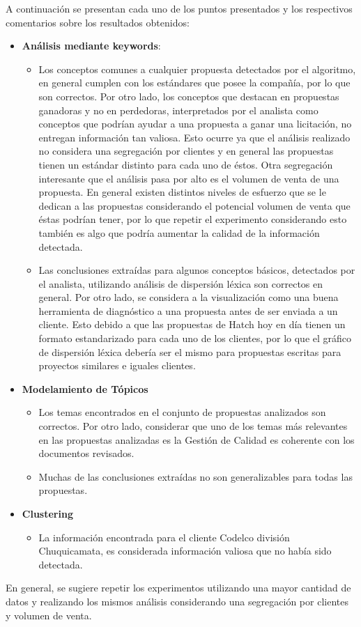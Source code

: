     A continuación se presentan cada uno de los puntos presentados y los respectivos comentarios sobre los resultados obtenidos:
    
    \begin{itemize}
        \item \textbf{Análisis mediante keywords}:
        \begin{itemize}
            \item Los conceptos comunes a cualquier propuesta detectados por el algoritmo, en general cumplen con los estándares que posee la compañía, por lo que son correctos. Por otro lado, los conceptos que destacan en propuestas ganadoras y no en perdedoras, interpretados por el analista como conceptos que podrían ayudar a una propuesta a ganar una licitación,  no entregan información tan valiosa. Esto ocurre ya que el análisis realizado no considera una segregación por clientes y en general las propuestas tienen un estándar distinto para cada uno de éstos. Otra segregación interesante que el análisis pasa por alto es el volumen de venta de una propuesta. En general existen distintos niveles de esfuerzo que se le dedican a las propuestas considerando el potencial volumen de venta que éstas podrían tener, por lo que repetir el experimento considerando esto también es algo que podría aumentar la calidad de la información detectada.
            
            \item Las conclusiones extraídas para algunos conceptos básicos, detectados por el analista, utilizando análisis de dispersión léxica son correctos en general. Por otro lado, se considera a la visualización como una buena herramienta de diagnóstico a una propuesta antes de ser enviada a un cliente. Esto debido a que las propuestas de Hatch hoy en día tienen un formato estandarizado para cada uno de los clientes, por lo que el gráfico de dispersión léxica debería ser el mismo para propuestas escritas para proyectos similares e iguales clientes. 
        \end{itemize}
        \item \textbf{Modelamiento de Tópicos }
        \begin{itemize}
            \item Los temas encontrados en el conjunto de propuestas analizados son correctos. Por otro lado, considerar que uno de los temas más relevantes en las propuestas analizadas es la Gestión de Calidad es coherente con los documentos revisados.
            \item Muchas de las conclusiones extraídas no son generalizables para todas las propuestas.
        \end{itemize}
        \item \textbf{Clustering}
        \begin{itemize}
            \item La información encontrada para el cliente Codelco división Chuquicamata, es considerada información valiosa que no había sido detectada.
        \end{itemize}
    \end{itemize}
    En general, se sugiere repetir los experimentos utilizando una mayor cantidad de datos y realizando los mismos análisis considerando una segregación por clientes y volumen de venta.
